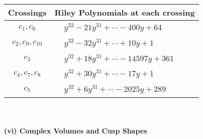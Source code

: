 \documentclass[1p]{elsarticle_modified}
\theoremstyle{definition}
\begin{document}
\begin{tabular}{m{50pt}|m{274pt}}
Crossings & \hspace{64pt}Riley Polynomials at each crossing \\
\hline $$\begin{aligned}c_{1},c_{6}\end{aligned}$$&$\begin{aligned}
&y^{32}-21 y^{31}+\cdots-400 y+64
\end{aligned}$\\
\hline $$\begin{aligned}c_{2},c_{9},c_{10}\end{aligned}$$&$\begin{aligned}
&y^{32}-32 y^{31}+\cdots+10 y+1
\end{aligned}$\\
\hline $$\begin{aligned}c_{3}\end{aligned}$$&$\begin{aligned}
&y^{32}+18 y^{31}+\cdots-14597 y+361
\end{aligned}$\\
\hline $$\begin{aligned}c_{4},c_{7},c_{8}\end{aligned}$$&$\begin{aligned}
&y^{32}+30 y^{31}+\cdots-17 y+1
\end{aligned}$\\
\hline $$\begin{aligned}c_{5}\end{aligned}$$&$\begin{aligned}
&y^{32}+6 y^{31}+\cdots-2025 y+289
\end{aligned}$\\
\hline
\end{tabular}\\~\\
\newpage\flushleft \textbf{(vi) Complex Volumes and Cusp Shapes}
\end{document}
